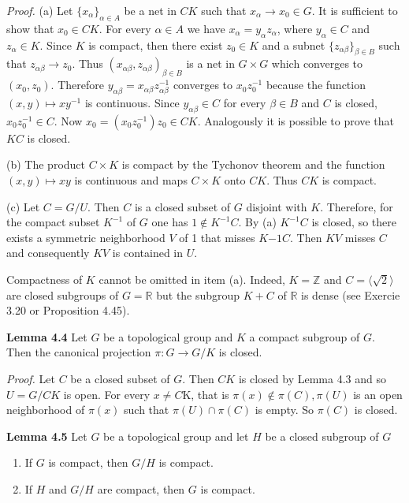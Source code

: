 \documentclass[12pt]{article}
\begin{document}
\emph{Proof.} (a) Let $\{x_\alpha\}_{\alpha \in A}$ be a net in $CK$ such that $x_\alpha \to x_0 \in G$. It is sufficient to show that $x_0 \in CK$. For
every $\alpha \in A$ we have $x_\alpha = y_\alpha z_\alpha$, where $y_\alpha \in C$ and $z_\alpha \in K$. Since $K$ is compact, then there exist $z_0 \in K$
and a subnet $\{z_{\alpha \beta}\}_{\beta \in B}$ such that $z_{\alpha \beta} \to z_0$. Thus $(x_{\alpha \beta}, z_{\alpha \beta})_{\beta \in B}$ is a net in $G \times G$ which converges to $(x_0, z_0)$.
Therefore $y_{\alpha \beta} = x_{\alpha \beta} z^{-1}_{\alpha \beta}$ converges to $x_0 z^{-1}_0$ because the function $(x, y) \mapsto xy^{-1}$ is continuous. Since $y_{\alpha \beta} \in C$
for every $\beta \in B$ and $C$ is closed, $x_0 z^{-1}_0 \in C$. Now $x_0 = (x_0 z^{-1}_0) z_0 \in CK$. Analogously it is possible to prove
that $KC$ is closed.
        

    (b) The product $C \times K$ is compact by the Tychonov theorem and the function $(x, y) \mapsto xy$ is continuous
and maps $C \times K$ onto $CK$. Thus $CK$ is compact.


    (c) Let $C = G / U$. Then $C$ is a closed subset of $G$ disjoint with $K$. Therefore, for the compact subset $K^{-1}$
of $G$ one has $1 \notin K^{-1}C$. By (a) $K^{-1}C$ is closed, so there exists a symmetric neighborhood $V$ of 1 that misses
$K{-1}C$. Then $KV$ misses $C$ and consequently $KV$ is contained in $U$.


    Compactness of $K$ cannot be omitted in item (a). Indeed, $K = \mathbb{Z}$ and $C = \langle \sqrt{2} \rangle$ are closed subgroups of
$G = \mathbb{R}$ but the subgroup $K + C$ of $\mathbb{R}$ is dense (see Exercie 3.20 or Proposition 4.45).


\textbf{Lemma 4.4} Let $G$ be a topological group and $K$ a compact subgroup of $G$. Then the canonical projection
$\pi : G \to G/K$ is closed.


\emph{Proof.} Let $C$ be a closed subset of $G$. Then $CK$ is closed by Lemma 4.3 and so $U = G / CK$ is open. For every
$x \neq C$K, that is $\pi(x) \notin \pi(C), \pi(U)$ is an open neighborhood of $\pi(x)$ such that $\pi(U) \cap \pi(C)$ is empty. So $\pi(C)$
is closed.


\textbf{Lemma 4.5} Let $G$ be a topological group and let $H$ be a closed subgroup of $G$


\begin{enumerate}

    \item If $G$ is compact, then $G/H$ is compact.

    \item If $H$ and $G/H$ are compact, then $G$ is compact.

\end{enumerate}
\end{document}
